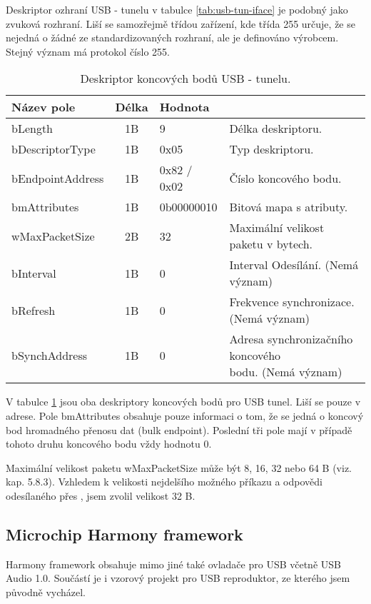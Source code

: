 Deskriptor ozhraní USB - \iic tunelu v tabulce \ref{tab:usb-tun-iface} je podobný jako zvuková rozhraní. Liší se samozřejmě třídou zařízení, kde třída 255 určuje, že se nejedná o žádné ze standardizovaných rozhraní, ale je definováno výrobcem. Stejný význam má protokol číslo 255.

\begin{table}[ht!]
\begin{center}
\begin{tabular}{|l|c|l|l|}
\hline 
Název pole & Délka & Hodnota &  \\ 
\hline
bLength & 1B & 9 & Délka deskriptoru.\\
\hline
bDescriptorType & 1B & 0x05 & Typ deskriptoru. \\
\hline
bEndpointAddress & 1B & 0x82 / 0x02 & Číslo koncového bodu. \\
\hline
bmAttributes & 1B & 0b00000010 & Bitová mapa s atributy.\\
\hline
wMaxPacketSize & 2B & 32 & Maximální velikost paketu v bytech.\\ 
\hline
bInterval & 1B & 0 & Interval Odesílání. (Nemá význam) \\ 
\hline
bRefresh & 1B & 0 & Frekvence synchronizace. (Nemá význam) \\
\hline 
bSynchAddress & 1B & 0 & \makecell[l]{Adresa synchronizačního koncového\\ bodu. (Nemá význam)} \\ 
\hline
\end{tabular} 
\end{center}
\caption{Deskriptor koncových bodů USB - \iic tunelu.}
\label{tab:usb-tun-ep} 
\end{table}

V tabulce \ref{tab:usb-tun-ep} jsou oba deskriptory koncových bodů pro USB \iic tunel. Liší se pouze v adrese. Pole bmAttributes obsahuje pouze informaci o tom, že se jedná o koncový bod hromadného přenosu dat (bulk endpoint). Poslední tři pole mají v případě tohoto druhu koncového bodu vždy hodnotu 0. 

Maximální velikost paketu wMaxPacketSize může být 8, 16, 32 nebo 64 B (viz. \cite{usb-spec} kap. 5.8.3). Vzhledem k velikosti nejdelšího možného příkazu a odpovědi odesílaného přes \iic, jsem zvolil velikost 32 B.

\subsection{Microchip Harmony framework}
Harmony framework obsahuje mimo jiné také ovladače pro USB včetně USB Audio 1.0. Součástí je i vzorový projekt pro USB reproduktor, ze kterého jsem původně vycházel. 


